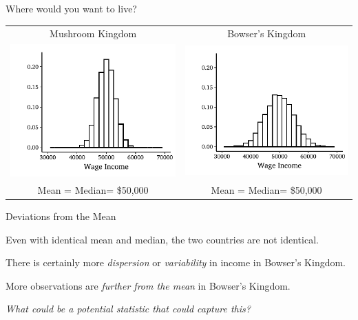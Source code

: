 \documentclass{./../div_teaching_slides}
\begin{document}
\begin{frame}{Where would you want to live?}
\centering
\begin{tabular}{cc}
Mushroom Kingdom  & Bowser's Kingdom \\
\includegraphics{./../../Output/income_mk.pdf} &
\includegraphics{./../../Output/income_bk.pdf} \\
Mean = Median= \$50,000 & Mean = Median= \$50,000 \\
\end{tabular}
\end{frame}

\begin{frame}{Deviations from the Mean}
\begin{witemize}
  \item Even with identical mean and median, the two countries are not identical. 
  \item There is certainly more \textit{dispersion} or \textit{variability} in income in Bowser's Kingdom. 
  \item More observations are \textit{further from the mean} in Bowser's Kingdom. 
  \item \textit{What could be a potential statistic that could capture this?}
\end{witemize}
\end{frame}
\end{document}
